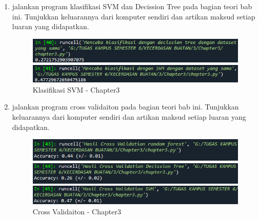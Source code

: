 \begin{enumerate}
    \item jalankan program klasifikasi SVM dan Decission Tree pada bagian teori bab ini. Tunjukkan keluarannya dari komputer sendiri dan artikan maksud setiap luaran yang didapatkan.
    \begin{figure}[ht]
        \centerline{\includegraphics[scale=0.7]{figures/chapter3-6.png}}
        \centerline{\includegraphics[scale=0.7]{figures/chapter3-6a.png}}
        \caption{Klasifikasi SVM - Chapter3}
        \label{Klasifikasi SVM - Chapter3}
    \end{figure}

    \item jalankan program cross validaiton pada bagian teori bab ini. Tunjukkan keluarannya dari komputer sendiri dan artikan maksud setiap luaran yang didapatkan.
    \begin{figure}[ht]
        \centerline{\includegraphics[scale=0.7]{figures/chapter3-7.png}}
        \centerline{\includegraphics[scale=0.7]{figures/chapter3-7a.png}}
        \centerline{\includegraphics[scale=0.7]{figures/chapter3-7b.png}}
        \caption{Cross Validaiton - Chapter3}
        \label{Cross Validaiton - Chapter3}
    \end{figure}
    \newpage


\end{enumerate}
